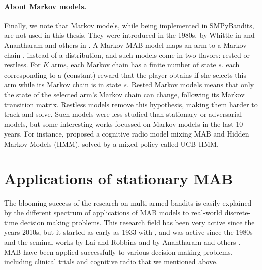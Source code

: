 \paragraph{About Markov models.}
%
Finally, we note that Markov models, while being implemented in SMPyBandits, are not used in this thesis.
They were introduced in the 1980s, by Whittle in \cite{Whittle1988} and Anantharam and others in \cite{Anantharam87b}.
A Markov MAB model maps an arm to a Markov chain \cite{Norris98}, instead of a distribution, and such models come in two flavors: rested or restless.
For $K$ arms, each Markov chain has a finite number of state $s$, each corresponding to a (constant) reward that the player obtains if she selects this arm while its Markov chain is in state $s$.
Rested Markov models means that only the state of the selected arm's Markov chain can change, following its Markov transition matrix.
Restless models remove this hypothesis, making them harder to track and solve.
%
Such models were less studied than stationary or adversarial models, but some interesting works focussed on Markov models in the last 10 years.
For instance, \cite{Melian15} proposed a cognitive radio model mixing MAB and Hidden Markov Models (HMM), solved by a mixed policy called UCB-HMM.



\section{Applications of stationary MAB}
\label{sec:2:applicationsofStationaryMAB}

The blooming success of the research on multi-armed bandits is easily explained by the different spectrum of applications of MAB models to real-world discrete-time decision making problems.
This research field has been very active since the years 2010s, but it started as early as 1933 with \cite{Thompson33}, and was active since the 1980s and the seminal works by Lai and Robbins \cite{LaiRobbins85} and by Anantharam and others \cite{Anantharam87a,Anantharam87b}.
%
MAB have been applied successfully to various decision making problems, including clinical trials and cognitive radio that we mentioned above.

